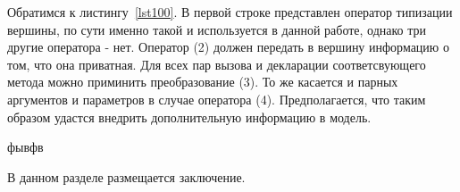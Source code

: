 \documentclass[times,specification,annotation]{itmo-student-thesis}
\begin{document}
Обратимся к листингу~\ref{lst100}. В первой строке представлен оператор типизации вершины, по сути именно такой и используется в данной работе, однако три другие оператора - нет. Оператор (2) должен передать в вершину информацию о том, что она приватная. Для всех пар вызова и декларации соответсвующего метода можно приминить преобразование (3). То же касается и парных аргументов и параметров в случае оператора (4). Предполагается, что таким образом удастся внедрить дополнительную информацию в модель.

\chapterconclusion
фывфв


\startconclusionpage

В данном разделе размещается заключение.

\printmainbibliography
\end{document}
